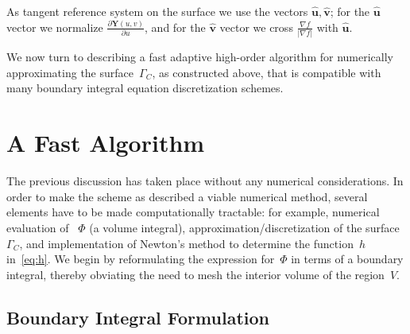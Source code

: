 \documentclass[11pt]{article}
\numberwithin{equation}{section}
\newcommand\bY{\boldsymbol Y}
\newcommand\bu{\boldsymbol u}
\newcommand\bv{\boldsymbol v}
\begin{document}
 
 
As tangent reference system on the surface we use the vectors $\hat{\bu}, \hat{\bv}$; for the  $\hat{\bu}$ vector we normalize $\frac{\partial\bY(u,v)}{\partial u}$, and for the $\hat{\bv}$ vector we cross $\frac{\nabla f}{|\nabla f|}$ with $\hat{\bu}$.





We now turn to describing a fast adaptive high-order algorithm for
numerically approximating the surface~$\Gamma_C$, as constructed
above, that is compatible with many boundary integral equation
discretization schemes.








\section{A Fast Algorithm}
\label{sec:algorithm}

The previous discussion has taken place without any numerical
considerations. In order to make the scheme as described a viable
numerical method, several elements have to be made computationally
tractable: for example, numerical evaluation of ~$\Phi$ (a volume
integral), approximation/discretization of the surface~$\Gamma_C$, and
implementation of Newton's method to determine the function~$h$
in~\eqref{eq:h}.
We begin by reformulating the expression for~$\Phi$ in terms of a
boundary integral, thereby obviating the need to mesh the interior
volume of the region~$V$.


\subsection{Boundary Integral Formulation}
\label{sec:bif}
\end{document}
